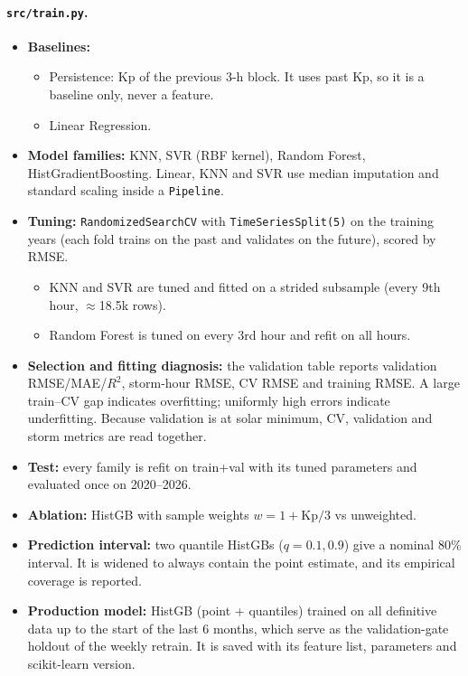 \documentclass[11pt,a4paper]{article}
\newcommand{\code}[1]{\texttt{#1}}
\begin{document}
\paragraph{\code{src/train.py}.}
\begin{itemize}
\item \textbf{Baselines:}
  \begin{itemize}
  \item Persistence: Kp of the previous 3-h block. It uses past Kp, so it is a baseline only, never a feature.
  \item Linear Regression.
  \end{itemize}
\item \textbf{Model families:} KNN, SVR (RBF kernel), Random Forest, HistGradientBoosting. Linear, KNN and SVR
use median imputation and standard scaling inside a \code{Pipeline}.
\item \textbf{Tuning:} \code{RandomizedSearchCV} with \code{TimeSeriesSplit(5)} on the training years (each
fold trains on the past and validates on the future), scored by RMSE.
  \begin{itemize}
  \item KNN and SVR are tuned and fitted on a strided subsample (every 9th hour, $\approx$18.5k rows).
  \item Random Forest is tuned on every 3rd hour and refit on all hours.
  \end{itemize}
\item \textbf{Selection and fitting diagnosis:} the validation table reports validation RMSE/MAE/$R^2$, storm-hour
RMSE, CV RMSE and training RMSE. A large train--CV gap indicates overfitting; uniformly high errors indicate
underfitting. Because validation is at solar minimum, CV, validation and storm metrics are read together.
\item \textbf{Test:} every family is refit on train+val with its tuned parameters and evaluated once on
2020--2026.
\item \textbf{Ablation:} HistGB with sample weights $w=1+\text{Kp}/3$ vs unweighted.
\item \textbf{Prediction interval:} two quantile HistGBs ($q=0.1, 0.9$) give a nominal 80\% interval. It is
widened to always contain the point estimate, and its empirical coverage is reported.
\item \textbf{Production model:} HistGB (point + quantiles) trained on all definitive data up to the start of the
last 6 months, which serve as the validation-gate holdout of the weekly retrain. It is saved with its feature
list, parameters and scikit-learn version.
\end{itemize}
\end{document}
